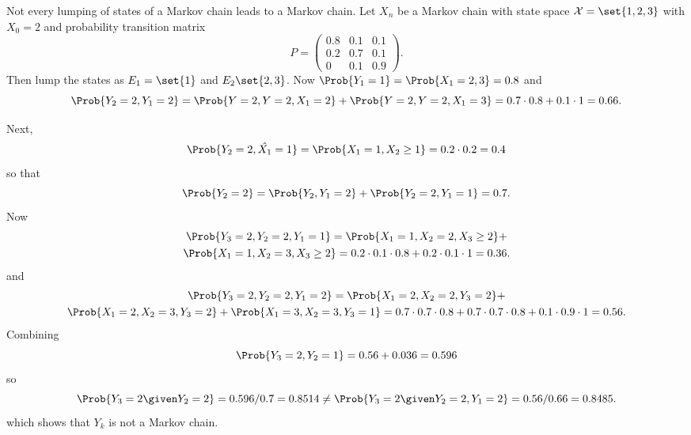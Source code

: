 \documentclass[12pt]{article}
\begin{document}
  \begin{example}
    Not every lumping of states of a Markov chain leads to a Markov
    chain. Let $X_n$ be a Markov chain with state space $\mathcal{X} =
    \set{1,2, 3}$ with $X_0 = 2$ and probability transition matrix
    \[
      P =   \begin{pmatrix}
    0.8 & 0.1 & 0.1 \\
    0.2 & 0.7 & 0.1 \\
    0   & 0.1 & 0.9
  \end{pmatrix}.
    \]
    Then lump the states as $E_1 = \set{1}$ and $E_2 \set{2,3}$.  Now
    \( \Prob{Y_1 = 1} = \Prob{X_1 = 2,3} = 0.8 \) and
    \[
    \Prob{Y_2 = 2, Y_1 = 2} = \Prob{Y = 2, Y
      =2, X_1 = 2} + \Prob{Y = 2, Y=2, X_1 = 3} 
    = 0.7 \cdot 0.8 + 0.1 \cdot 1 = 0.66.
    \]

    Next,
    \[
      \Prob{Y_2 = 2, \hat{X_1} = 1} = \Prob{X_1 = 1, X_2 \ge 1}
      = 0.2 \cdot 0.2 = 0.4
    \]
    so that
    \[
      \Prob{Y_2 = 2} = \Prob{Y_2, Y_1 = 2} + \Prob{Y_2=2, Y_1 = 1} = 0.7.
    \]
    Now
    \begin{multline*}
      \Prob{Y_3 = 2, Y_2=2, Y_1=1} = \Prob{X_1=1, X_2=2, X_3 \ge 2} +\\
       \Prob{X_1=1, X_2=3, X_3 \ge 2} = 0.2 \cdot 0.1 \cdot 0.8 + 0.2
       \cdot 0.1 \cdot 1 = 0.36.
     \end{multline*}
     and
    \begin{multline*}
      \Prob{Y_3 = 2, Y_2=2, Y_1=2} = \Prob{X_1=2, X_2=2, Y_3 =2} +\\
       \Prob{X_1=2, X_2=3, Y_3 =2} + \Prob{X_1=3, X_2=3, Y_3 =1} = 0.7 \cdot 0.7 \cdot 0.8 + 0.7
       \cdot 0.7 \cdot 0.8 + 0.1 \cdot 0.9 \cdot 1 = 0.56.
     \end{multline*}
     Combining
     \[
       \Prob{Y_3 = 2, Y_2 = 1} = 0.56 + 0.036 = 0.596
     \]
     so
     \[
       \Prob{Y_3=2 \given Y_2 = 2} = 0.596/0.7 = 0.8514 \ne \Prob{Y_3
         = 2 \given Y_2 = 2, Y_1=2} = 0.56/0.66 = 0.8485.
     \]
     which shows that $Y_k$ is not a Markov chain.
  \end{example}
\end{document}
